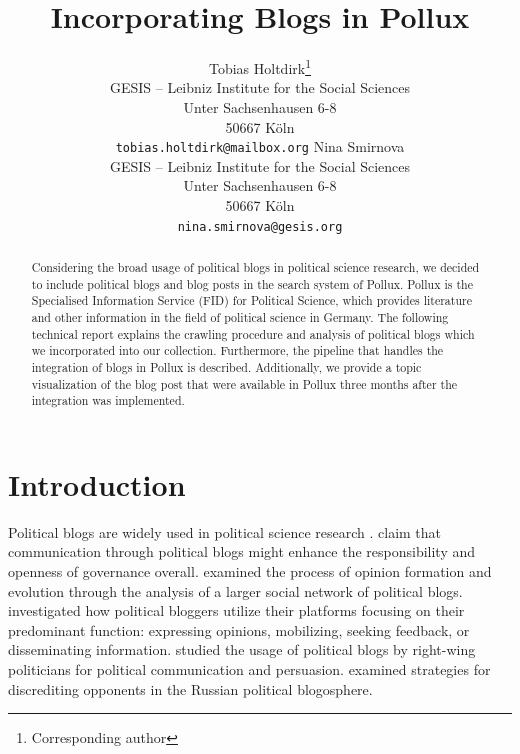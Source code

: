 \documentclass{article}
\title{Incorporating Blogs in Pollux}
\author{Tobias Holtdirk\thanks{Corresponding author}\\
	GESIS -- Leibniz Institute for the Social Sciences\\
	Unter Sachsenhausen 6-8 \\
    50667 Köln \\
	\texttt{tobias.holtdirk@mailbox.org}
    \And 
    Nina Smirnova\\
	GESIS -- Leibniz Institute for the Social Sciences\\
	Unter Sachsenhausen 6-8 \\
    50667 Köln \\
	\texttt{nina.smirnova@gesis.org}
}
\begin{document}
\maketitle

\begin{abstract}
    Considering the broad usage of political blogs in political science research, we decided to include political blogs and blog posts in the search system of Pollux. Pollux is the Specialised Information Service (FID) for Political Science, which provides literature and other information in the field of political science in Germany. The following technical report explains the crawling procedure and analysis of political blogs which we incorporated into our collection. Furthermore, the pipeline that handles the integration of blogs in Pollux is described. Additionally, we provide a topic visualization of the blog post that were available in Pollux three months after  the integration was implemented. 
\end{abstract}



\section{Introduction}
Political blogs are widely used in political science research \citep{wallsten_agenda_2007, coleman_political_2008, wallsten_political_2008, guner_political_2009, akinnubi_deliberative_2023, peng_role_2023}. \citet{coleman_political_2008} claim that communication through political blogs might enhance the responsibility and openness of governance overall. \citet{peng_role_2023} examined the process of opinion formation and evolution through the analysis of a larger social network of political blogs. \citet{wallsten_political_2008} investigated how political bloggers utilize their platforms focusing on their predominant function: expressing opinions, mobilizing, seeking feedback, or disseminating information. \citet{demasi_analysing_2020} studied the usage of political blogs by right-wing politicians for political communication and persuasion. \citet{balakhonskaya_communicative_2020} examined strategies for discrediting opponents in the Russian political blogosphere.
\end{document}
